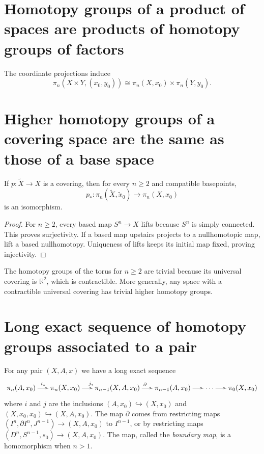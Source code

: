 \section{Homotopy groups of a product of
spaces
are products of homotopy groups of factors}
\label{section-homot-group-produ-space}

The coordinate projections induce
$$
\pi_n(X\times Y,(x_0,y_0))
\cong
\pi_n(X,x_0)\times\pi_n(Y,y_0).
$$

\section{Higher homotopy groups of a covering
space
are the same as those of a base space}
\label{section-highe-homot-group-cover}

If $p:\widetilde X\to X$ is a covering,
then for every $n\geq2$ and compatible
basepoints,
$$
p_*:\pi_n(\widetilde X,\widetilde x_0)
\longrightarrow
\pi_n(X,x_0)
$$
is an isomorphism.

\begin{proof}
For $n\geq2$, every based map $S^n\to X$
lifts because $S^n$ is simply connected.
This proves surjectivity. If a based map
upstairs projects to a nullhomotopic map,
lift a based nullhomotopy. Uniqueness of
lifts keeps its initial map fixed,
proving injectivity.
\end{proof}

\begin{example}
The homotopy groups of the torus for
$n\geq2$ are trivial because its
universal covering is $\mathbb{R}^2$,
which is contractible. More generally,
any space with a contractible universal
covering has trivial higher homotopy
groups.
\end{example}

\section{Long exact sequence of homotopy
groups associated to a pair}
\label{section-long-exact-seque-homot-grou}

For any pair $(X,A,x)$ we have a long exact
sequence
$$
\xymatrix@C=1.5em{
\pi_n(A,x_0)\ar[r]^{i_*}
& \pi_{n}(X,x_0)\ar[r]^{j_*}
& \pi_{n-1}(X,A,x_0)\ar[r]^{\partial}
& \pi_{n-1}(A,x_0)\ar[r]
& \cdots\ar[r]
& \pi_0(X,x_0)
}
$$
where $i$ and $j$ are the inclusions
$(A,x_0)\hookrightarrow(X,x_0)$ and
$(X,x_0,x_0)\hookrightarrow(X,A,x_0)$. The
map $\partial$ comes from restricting maps
$(I^n,\partial I^n,J^{n-1})\to (X,A,x_0)$ to
$I^{n-1}$, or by restricting maps
$(D^n,S^{n-1},s_0)\to (X,A,x_0)$. The map,
called the {\it boundary map}, is a
homomorphism when $n>1$.

